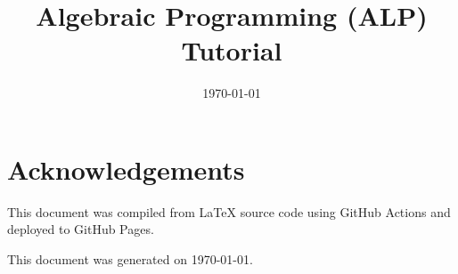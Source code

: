 \documentclass{article}
\title{Algebraic Programming (ALP) Tutorial}
\author{}
\date{\today} %
\begin{document}
\maketitle

\tableofcontents







\section*{Acknowledgements}

This document was compiled from \LaTeX{} source code using GitHub Actions and deployed to GitHub Pages.

\vfill %
\centering
\small This document was generated on \today.
\end{document}
